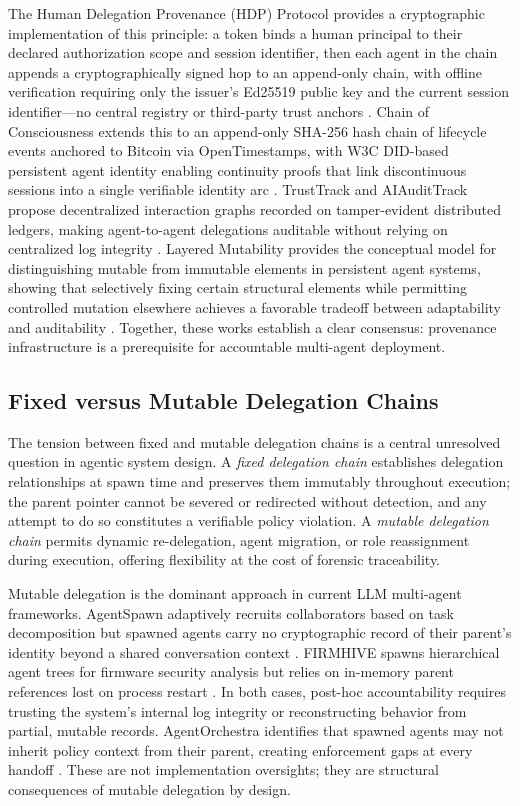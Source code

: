 The Human Delegation Provenance (HDP) Protocol provides a cryptographic implementation of this principle: a token binds a human principal to their declared authorization scope and session identifier, then each agent in the chain appends a cryptographically signed hop to an append-only chain, with offline verification requiring only the issuer's Ed25519 public key and the current session identifier---no central registry or third-party trust anchors \cite{hdp2025arxiv}. Chain of Consciousness extends this to an append-only SHA-256 hash chain of lifecycle events anchored to Bitcoin via OpenTimestamps, with W3C DID-based persistent agent identity enabling continuity proofs that link discontinuous sessions into a single verifiable identity arc \cite{chainofconsciousness2026}. TrustTrack and AIAuditTrack propose decentralized interaction graphs recorded on tamper-evident distributed ledgers, making agent-to-agent delegations auditable without relying on centralized log integrity \cite{trusttrack2025, aaudittrack2025}. Layered Mutability provides the conceptual model for distinguishing mutable from immutable elements in persistent agent systems, showing that selectively fixing certain structural elements while permitting controlled mutation elsewhere achieves a favorable tradeoff between adaptability and auditability \cite{layeredmutability2026}. Together, these works establish a clear consensus: provenance infrastructure is a prerequisite for accountable multi-agent deployment.

\subsection{Fixed versus Mutable Delegation Chains}

The tension between fixed and mutable delegation chains is a central unresolved question in agentic system design. A \textit{fixed delegation chain} establishes delegation relationships at spawn time and preserves them immutably throughout execution; the parent pointer cannot be severed or redirected without detection, and any attempt to do so constitutes a verifiable policy violation. A \textit{mutable delegation chain} permits dynamic re-delegation, agent migration, or role reassignment during execution, offering flexibility at the cost of forensic traceability.

Mutable delegation is the dominant approach in current LLM multi-agent frameworks. AgentSpawn adaptively recruits collaborators based on task decomposition but spawned agents carry no cryptographic record of their parent's identity beyond a shared conversation context \cite{agentspawn2025}. FIRMHIVE spawns hierarchical agent trees for firmware security analysis but relies on in-memory parent references lost on process restart \cite{firmhive2025}. In both cases, post-hoc accountability requires trusting the system's internal log integrity or reconstructing behavior from partial, mutable records. AgentOrchestra identifies that spawned agents may not inherit policy context from their parent, creating enforcement gaps at every handoff \cite{agentorchestra2025}. These are not implementation oversights; they are structural consequences of mutable delegation by design.

